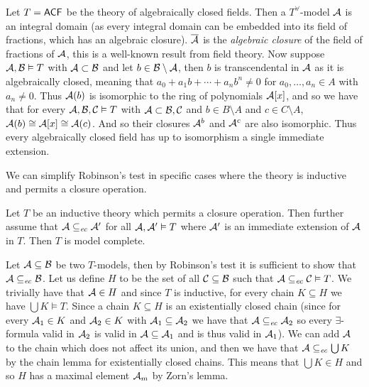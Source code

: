     Let $T={\sf ACF}$ be the theory of algebraically closed fields.
    Then a $T^\forall$-model ${\cal A}$ is an integral domain (as every integral domain can be embedded into its field of fractions, which has an algebraic closure).
    $\overline{{\cal A}}$ is the {\it algebraic closure} of the field of fractions of ${\cal A}$, this is a well-known result from field theory.
    Now suppose ${\cal A},{\cal B}\vDash T$ with ${\cal A}\subset{\cal B}$ and let $b\in{\cal B}\setminus{\cal A}$, then $b$ is transcendental in ${\cal A}$ as it is algebraically closed, meaning that
    $a_0+a_1b+\cdots+a_nb^n\neq0$ for $a_0,\dots,a_n\in A$ with $a_n\neq0$.
    Thus ${\cal A}(b)$ is isomorphic to the ring of polynomials ${\cal A}[x]$, and so we have that for every ${\cal A},{\cal B},{\cal C}\vDash T$ with ${\cal A}\subset{\cal B},{\cal C}$ and
    $b\in B\setminus A$ and $c\in C\setminus A$, ${\cal A}(b)\cong{\cal A}[x]\cong{\cal A}(c)$.
    And so their closures ${\cal A}^b$ and ${\cal A}^c$ are also isomorphic.
    Thus every algebraically closed field has up to isomorphism a single immediate extension.

\eexam

We can simplify Robinson's test in specific cases where the theory is inductive and permits a closure operation.

\blemm

    Let $T$ be an inductive theory which permits a closure operation.
    Then further assume that ${\cal A}\subseteq_{\it ec}{\cal A}'$ for all ${\cal A},{\cal A}'\vDash T$ where ${\cal A}'$ is an immediate extension of ${\cal A}$ in $T$.
    Then $T$ is model complete.

\elemm

Let ${\cal A}\subseteq{\cal B}$ be two $T$-models, then by Robinson's test it is sufficient to show that ${\cal A}\subseteq_{\it ec}{\cal B}$.
Let us define $H$ to be the set of all ${\cal C}\subseteq{\cal B}$ such that ${\cal A}\subseteq_{\it ec}{\cal C}\vDash T$.
We trivially have that ${\cal A}\in H$ and since $T$ is inductive, for every chain $K\subseteq H$ we have $\bigcup K\vDash T$.
Since a chain $K\subseteq H$ is an existentially closed chain (since for every ${\cal A}_1\in K$ and ${\cal A}_2\in K$ with ${\cal A}_1\subseteq{\cal A}_2$ we have that ${\cal A}\subseteq_{\it ec}{\cal A}_2$
so every $\exists$-formula valid in ${\cal A}_2$ is valid in ${\cal A}\subseteq{\cal A}_1$ and is thus valid in ${\cal A}_1$).
We can add ${\cal A}$ to the chain which does not affect its union, and then we have that ${\cal A}\subseteq_{\it ec}\bigcup K$ by the chain lemma for existentially closed chains.
This means that $\bigcup K\in H$ and so $H$ has a maximal element ${\cal A}_m$ by Zorn's lemma.

